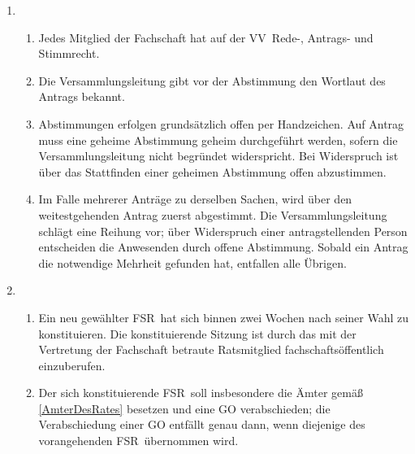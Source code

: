 \documentclass[a4paper, 12pt]{article}
\newcommand{\vv}{VV}
\newcommand{\rat}{FSR}
\newcommand{\rates}{FSR}
\begin{document}
\begin{enumerate}[leftmargin=0cm]
	\item {}
	
	\begin{enumerate}[leftmargin=0cm]
		\item Jedes Mitglied der Fachschaft hat auf der \vv~Rede-, Antrags- und Stimmrecht.
		\item Die Versammlungsleitung gibt vor der Abstimmung den Wortlaut des Antrags bekannt.
		\item Abstimmungen erfolgen grundsätzlich offen per Handzeichen. 
		Auf Antrag muss eine geheime Abstimmung geheim durchgeführt werden, sofern die Versammlungsleitung nicht begründet widerspricht. Bei Widerspruch ist über das Stattfinden einer geheimen Abstimmung offen abzustimmen.
		\item Im Falle mehrerer Anträge zu derselben Sachen, wird über den weitestgehenden Antrag zuerst abgestimmt. Die Versammlungsleitung schlägt eine Reihung vor; über Widerspruch einer antragstellenden Person entscheiden die Anwesenden durch offene Abstimmung. Sobald ein Antrag die notwendige Mehrheit gefunden hat, entfallen alle Übrigen.
	\end{enumerate}


	\item {}
	\begin{enumerate}[leftmargin=0cm]
		\item Ein neu gewählter \rat~hat sich binnen zwei Wochen nach seiner Wahl zu konstituieren. Die konstituierende Sitzung ist durch das mit der Vertretung der Fachschaft betraute Ratsmitglied fachschaftsöffentlich einzuberufen.
		\item Der sich konstituierende \rat~soll insbesondere die Ämter gemäß \cref{AmterDesRates} besetzen und eine GO verabschieden; die Verabschiedung einer GO entfällt genau dann, wenn diejenige des vorangehenden \rates~übernommen wird.
	\end{enumerate}


\end{enumerate}
\end{document}
